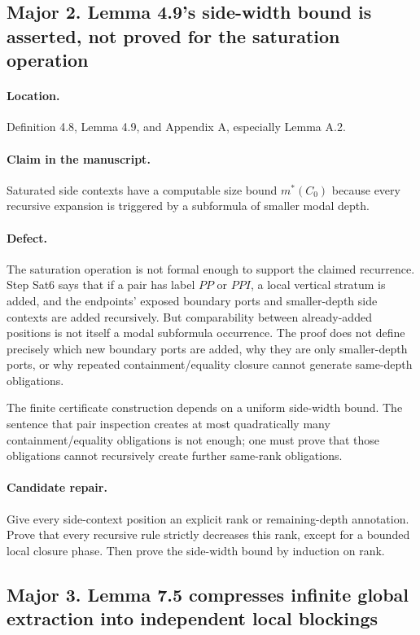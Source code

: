 \documentclass[11pt]{article}
\begin{document}
\subsection*{Major 2. Lemma 4.9's side-width bound is asserted, not proved for the saturation operation}

\paragraph{Location.} Definition 4.8, Lemma 4.9, and Appendix A, especially Lemma A.2.

\paragraph{Claim in the manuscript.} Saturated side contexts have a computable size bound $m^{\ast}(C_0)$ because every recursive expansion is triggered by a subformula of smaller modal depth.

\paragraph{Defect.} The saturation operation is not formal enough to support the claimed recurrence. Step Sat6 says that if a pair has label $PP$ or $PPI$, a local vertical stratum is added, and the endpoints' exposed boundary ports and smaller-depth side contexts are added recursively. But comparability between already-added positions is not itself a modal subformula occurrence. The proof does not define precisely which new boundary ports are added, why they are only smaller-depth ports, or why repeated containment/equality closure cannot generate same-depth obligations.

The finite certificate construction depends on a uniform side-width bound. The sentence that pair inspection creates at most quadratically many containment/equality obligations is not enough; one must prove that those obligations cannot recursively create further same-rank obligations.

\paragraph{Candidate repair.} Give every side-context position an explicit rank or remaining-depth annotation. Prove that every recursive rule strictly decreases this rank, except for a bounded local closure phase. Then prove the side-width bound by induction on rank.

\subsection*{Major 3. Lemma 7.5 compresses infinite global extraction into independent local blockings}
\end{document}
